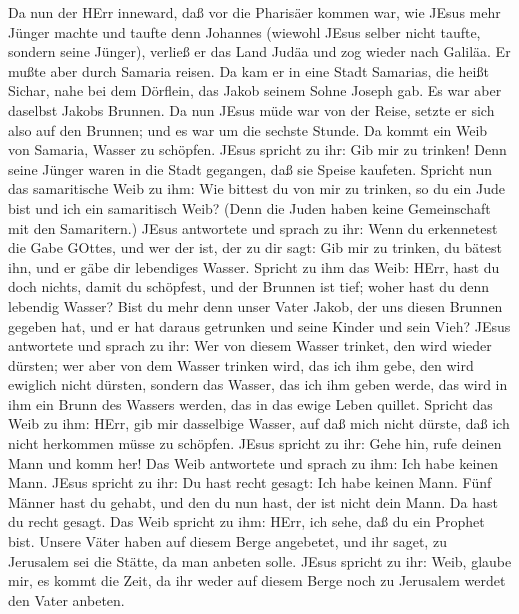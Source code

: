  Da nun der HErr inneward, daß vor die Pharisäer kommen war,
wie JEsus mehr Jünger machte und taufte denn Johannes 
(wiewohl JEsus selber nicht taufte, sondern seine Jünger), 
verließ er das Land Judäa und zog wieder nach Galiläa.  Er
mußte aber durch Samaria reisen.  Da kam er in eine Stadt
Samarias, die heißt Sichar, nahe bei dem Dörflein, das Jakob seinem
Sohne Joseph gab.  Es war aber daselbst Jakobs Brunnen. Da
nun JEsus müde war von der Reise, setzte er sich also auf den Brunnen;
und es war um die sechste Stunde.  Da kommt ein Weib von
Samaria, Wasser zu schöpfen. JEsus spricht zu ihr: Gib mir zu trinken!
 Denn seine Jünger waren in die Stadt gegangen, daß sie
Speise kaufeten.  Spricht nun das samaritische Weib zu ihm:
Wie bittest du von mir zu trinken, so du ein Jude bist und ich ein
samaritisch Weib? (Denn die Juden haben keine Gemeinschaft mit den
Samaritern.)  JEsus antwortete und sprach zu ihr: Wenn du
erkennetest die Gabe GOttes, und wer der ist, der zu dir sagt: Gib mir
zu trinken, du bätest ihn, und er gäbe dir lebendiges Wasser.
 Spricht zu ihm das Weib: HErr, hast du doch nichts, damit
du schöpfest, und der Brunnen ist tief; woher hast du denn lebendig
Wasser?  Bist du mehr denn unser Vater Jakob, der uns
diesen Brunnen gegeben hat, und er hat daraus getrunken und seine Kinder
und sein Vieh?  JEsus antwortete und sprach zu ihr: Wer von
diesem Wasser trinket, den wird wieder dürsten;  wer aber
von dem Wasser trinken wird, das ich ihm gebe, den wird ewiglich nicht
dürsten, sondern das Wasser, das ich ihm geben werde, das wird in ihm
ein Brunn des Wassers werden, das in das ewige Leben quillet.
 Spricht das Weib zu ihm: HErr, gib mir dasselbige Wasser,
auf daß mich nicht dürste, daß ich nicht herkommen müsse zu schöpfen.
 JEsus spricht zu ihr: Gehe hin, rufe deinen Mann und komm
her!  Das Weib antwortete und sprach zu ihm: Ich habe
keinen Mann. JEsus spricht zu ihr: Du hast recht gesagt: Ich habe keinen
Mann.  Fünf Männer hast du gehabt, und den du nun hast, der
ist nicht dein Mann. Da hast du recht gesagt.  Das Weib
spricht zu ihm: HErr, ich sehe, daß du ein Prophet bist. 
Unsere Väter haben auf diesem Berge angebetet, und ihr saget, zu
Jerusalem sei die Stätte, da man anbeten solle.  JEsus
spricht zu ihr: Weib, glaube mir, es kommt die Zeit, da ihr weder auf
diesem Berge noch zu Jerusalem werdet den Vater anbeten. 
